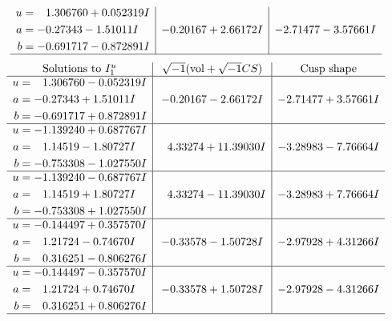 \documentclass[1p]{elsarticle_modified}
\theoremstyle{definition}
\newcommand{\I}{\sqrt{-1}}
\begin{document}
$$\begin{array}{c|c|c}
\begin{aligned}
u &= \phantom{-}1.306760 + 0.052319 I \\
a &= -0.27343 - 1.51011 I \\
b &= -0.691717 - 0.872891 I\end{aligned}
 & -0.20167 + 2.66172 I & -2.71477 - 3.57661 I\\
 \hline 
 \end{array}$$\newpage$$\begin{array}{c|c|c}  
\text{Solutions to }I^u_{1}& \I (\text{vol} + \sqrt{-1}CS) & \text{Cusp shape}\\
 \hline 
\begin{aligned}
u &= \phantom{-}1.306760 - 0.052319 I \\
a &= -0.27343 + 1.51011 I \\
b &= -0.691717 + 0.872891 I\end{aligned}
 & -0.20167 - 2.66172 I & -2.71477 + 3.57661 I \\ \hline\begin{aligned}
u &= -1.139240 + 0.687767 I \\
a &= \phantom{-}1.14519 - 1.80727 I \\
b &= -0.753308 - 1.027550 I\end{aligned}
 & \phantom{-}4.33274 + 11.39030 I & -3.28983 - 7.76664 I \\ \hline\begin{aligned}
u &= -1.139240 - 0.687767 I \\
a &= \phantom{-}1.14519 + 1.80727 I \\
b &= -0.753308 + 1.027550 I\end{aligned}
 & \phantom{-}4.33274 - 11.39030 I & -3.28983 + 7.76664 I \\ \hline\begin{aligned}
u &= -0.144497 + 0.357570 I \\
a &= \phantom{-}1.21724 - 0.74670 I \\
b &= \phantom{-}0.316251 - 0.806276 I\end{aligned}
 & -0.33578 - 1.50728 I & -2.97928 + 4.31266 I \\ \hline\begin{aligned}
u &= -0.144497 - 0.357570 I \\
a &= \phantom{-}1.21724 + 0.74670 I \\
b &= \phantom{-}0.316251 + 0.806276 I\end{aligned}
 & -0.33578 + 1.50728 I & -2.97928 - 4.31266 I\\
 \hline 
 \end{array}$$\newpage\newpage\renewcommand{\arraystretch}{1}
\end{document}
